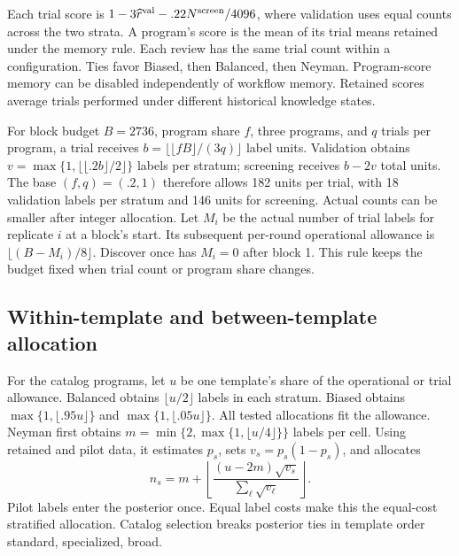 Each trial score is $1-3\widehat r^{\rm val}-.22N^{\rm screen}/4096$, where validation uses equal counts across the two strata. A program's score is the mean of its trial means retained under the memory rule. Each review has the same trial count within a configuration. Ties favor Biased, then Balanced, then Neyman. Program-score memory can be disabled independently of workflow memory. Retained scores average trials performed under different historical knowledge states.

For block budget $B=2736$, program share $f$, three programs, and $q$ trials per program, a trial receives $b=\lfloor\lfloor fB\rfloor/(3q)\rfloor$ label units. Validation obtains $v=\max\{1,\lfloor\lfloor .2b\rfloor/2\rfloor\}$ labels per stratum; screening receives $b-2v$ total units. The base $(f,q)=(.2,1)$ therefore allows 182 units per trial, with 18 validation labels per stratum and 146 units for screening. Actual counts can be smaller after integer allocation. Let $M_i$ be the actual number of trial labels for replicate $i$ at a block's start. Its subsequent per-round operational allowance is $\lfloor(B-M_i)/8\rfloor$. Discover once has $M_i=0$ after block 1. This rule keeps the budget fixed when trial count or program share changes.

\subsection{Within-template and between-template allocation}
For the catalog programs, let $u$ be one template's share of the operational or trial allowance. Balanced obtains $\lfloor u/2\rfloor$ labels in each stratum. Biased obtains $\max\{1,\lfloor .95u\rfloor\}$ and $\max\{1,\lfloor .05u\rfloor\}$. All tested allocations fit the allowance. Neyman first obtains $m=\min\{2,\max\{1,\lfloor u/4\rfloor\}\}$ labels per cell. Using retained and pilot data, it estimates $p_s$, sets $v_s=p_s(1-p_s)$, and allocates
\begin{equation}
n_s=m+\left\lfloor\frac{(u-2m)\sqrt{v_s}}{\sum_\ell\sqrt{v_\ell}}\right\rfloor.
\end{equation}
Pilot labels enter the posterior once. Equal label costs make this the equal-cost stratified allocation. Catalog selection breaks posterior ties in template order standard, specialized, broad.

